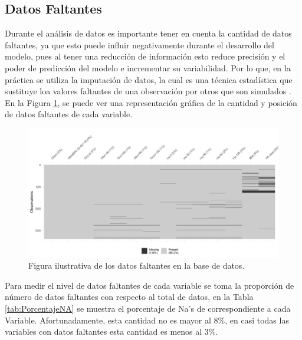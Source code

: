 
\subsection{Datos Faltantes}

Durante el análisis de datos es importante tener en cuenta la cantidad de datos faltantes, ya que esto puede influir negativamente durante el desarrollo del modelo, pues al tener una reducción de información esto reduce precisión y el poder de predicción del modelo e incrementar su variabilidad. Por lo que, en la práctica se utiliza la imputación de datos, la cual es una técnica estadística que sustituye loa valores faltantes de una observación por otros que son simulados \cite{Imputacion}. En la Figura \ref{fig:Nas}, se puede ver una representación gráfica de la cantidad y posición de datos faltantes de cada variable.

\begin{figure}[H]
    \centering
    \includegraphics[width = 0.8 \textwidth, height = 6 cm]{Imagenes/datosFaltantes.png}
    \caption{Figura ilustrativa de los datos faltantes en la base de datos.}
    \label{fig:Nas}
\end{figure}

Para medir el nivel de datos faltantes de cada variable se toma la proporción de número de datos faltantes con respecto al total de datos, en la Tabla \ref{tab:PorcentajeNA} se muestra el porcentaje de Na's de correspondiente a cada Variable. Afortunadamente, esta cantidad no es mayor al $8 \%$, en casi todas las variables con datos faltantes esta cantidad es menos al $3\%$. 

